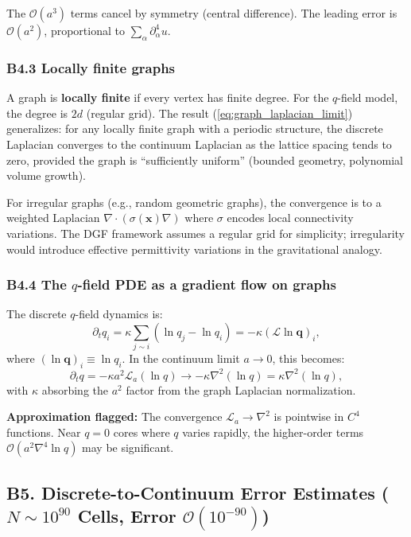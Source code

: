 \documentclass[reprint]{revtex4-2}
\begin{document}
The $\mathcal{O}(a^3)$ terms cancel by symmetry (central difference). The leading error is $\mathcal{O}(a^2)$, proportional to $\sum_\alpha \partial_\alpha^4 u$.

\subsubsection{B4.3 Locally finite graphs}

A graph is \textbf{locally finite} if every vertex has finite degree. For the $q$-field model, the degree is $2d$ (regular grid). The result (\ref{eq:graph_laplacian_limit}) generalizes: for any locally finite graph with a periodic structure, the discrete Laplacian converges to the continuum Laplacian as the lattice spacing tends to zero, provided the graph is ``sufficiently uniform'' (bounded geometry, polynomial volume growth).

For irregular graphs (e.g., random geometric graphs), the convergence is to a weighted Laplacian $\nabla\cdot(\sigma(\mathbf{x})\nabla)$ where $\sigma$ encodes local connectivity variations. The DGF framework assumes a regular grid for simplicity; irregularity would introduce effective permittivity variations in the gravitational analogy.

\subsubsection{B4.4 The $q$-field PDE as a gradient flow on graphs}

The discrete $q$-field dynamics is:
\begin{equation}
\partial_t q_i = \kappa\sum_{j\sim i} (\ln q_j - \ln q_i) = -\kappa(\mathcal{L}\ln\mathbf{q})_i,
\end{equation}
where $(\ln\mathbf{q})_i \equiv \ln q_i$. In the continuum limit $a\to 0$, this becomes:
\begin{equation}
\partial_t q = -\kappa a^2\mathcal{L}_a(\ln q) \to -\kappa\nabla^2(\ln q) = \kappa\nabla^2(\ln q),
\end{equation}
with $\kappa$ absorbing the $a^2$ factor from the graph Laplacian normalization.

\textbf{Approximation flagged:} The convergence $\mathcal{L}_a \to \nabla^2$ is pointwise in $C^4$ functions. Near $q=0$ cores where $q$ varies rapidly, the higher-order terms $\mathcal{O}(a^2\nabla^4\ln q)$ may be significant.

\subsection{B5. Discrete-to-Continuum Error Estimates ($N\sim 10^{90}$ Cells, Error $\mathcal{O}(10^{-90})$)}
\end{document}
